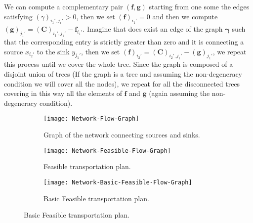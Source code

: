 We can compute a complementary pair $(\mathbf{f}, \mathbf{g})$ starting from one some the edges satisfying $(\gamma)_{i_1',j_1'}>0$, then we set $(\mathbf{f})_{i_1'}=0$ and then we compute $(\mathbf{g})_{j_1'}=(\mathbf{C})_{i_1',j_1'}-\mathbf{f}_{i_1'}$. Imagine that does exist an edge of the graph $\pmb{\gamma}$ such that the corresponding entry is strictly greater than zero and it is connecting a source $x_{i_2'}$ to the sink $y_{j_1'}$, then we set $(\mathbf{f})_{i_2'}=(\mathbf{C})_{i_2',j_1'}-(\mathbf{g})_{j_1'}$, we repeat this process until we cover the whole tree. Since the graph is composed of a disjoint union of trees (If the graph is a tree and assuming the non-degeneracy condition we will cover all the nodes), we repeat for all the disconnected trees covering in this way all the elements of $\mathbf{f}$ and $\mathbf{g}$ (again assuming the non-degeneracy condition).
 
\begin{figure}[H]
 \begin{center}
	\begin{subfigure}{0.32\textwidth}
		\centering
	 	\caption{Graph of the network connecting sources and sinks.}
	 	\texttt{[image: Network-Flow-Graph]}
	\end{subfigure}
	\begin{subfigure}{0.32\textwidth}
		\centering
		\caption{Feasible transportation plan.}
		\texttt{[image: Network-Feasible-Flow-Graph]}
	\end{subfigure}
	\begin{subfigure}{0.32\textwidth}
		\centering
		\caption{Basic Feasible transportation plan.}
		\texttt{[image: Network-Basic-Feasible-Flow-Graph]}
	\end{subfigure}
 \end{center}
\end{figure}

